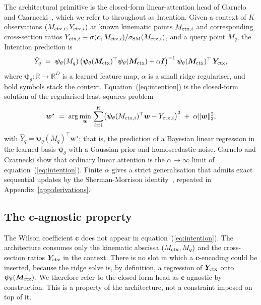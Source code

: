 \documentclass[11pt,a4paper]{article}
\newcommand{\sigsm}{\sigma_{\rm SM}}
\newcommand{\psib}{\bm{\psi}}
\begin{document}
The architectural primitive is the closed-form linear-attention head of Garnelo and Czarnecki~\cite{Garnelo:2023intention}, which we refer to throughout as Intention. Given a context of $K$ observations $(M_{{\rm ctx}, i}, Y_{{\rm ctx}, i})$ at known kinematic points $M_{{\rm ctx}, i}$ and corresponding cross-section ratios $Y_{{\rm ctx}, i} \equiv \sigma(\bm{c}, M_{{\rm ctx}, i}) / \sigsm(M_{{\rm ctx}, i})$, and a query point $M_q$, the Intention prediction is
\begin{equation}
  \hat{Y}_q \;=\; \psib_\theta(M_q)\,\bigl(\psib_\theta(\bm{M}_{\rm ctx})^\top \psib_\theta(\bm{M}_{\rm ctx}) + \alpha \bm{I}\bigr)^{-1}\,\psib_\theta(\bm{M}_{\rm ctx})^\top\,\bm{Y}_{\rm ctx},
  \label{eq:intention}
\end{equation}
where $\psib_\theta : \mathbb{R} \to \mathbb{R}^{D}$ is a learned feature map, $\alpha$ is a small ridge regulariser, and bold symbols stack the context. Equation~(\ref{eq:intention}) is the closed-form solution of the regularised least-squares problem
\begin{equation}
  \bm{w}^\star \;=\; \arg\min_{\bm{w}} \,\sum_{i=1}^K\bigl(\psib_\theta(M_{{\rm ctx}, i})^\top \bm{w} - Y_{{\rm ctx}, i}\bigr)^2 \;+\; \alpha \|\bm{w}\|_2^2,
  \label{eq:ridge}
\end{equation}
with $\hat{Y}_q = \psib_\theta(M_q)^\top \bm{w}^\star$; that is, the prediction of a Bayesian linear regression in the learned basis $\psib_\theta$ with a Gaussian prior and homoscedastic noise. Garnelo and Czarnecki show that ordinary linear attention is the $\alpha \to \infty$ limit of equation~(\ref{eq:intention}). Finite $\alpha$ gives a strict generalisation that admits exact sequential updates by the Sherman-Morrison identity~\cite{Sherman:1950}, repeated in Appendix~\ref{app:derivations}.

\subsection{The \texorpdfstring{$\bm{c}$}{c}-agnostic property}
\label{sec:c-agnostic}

The Wilson coefficient $\bm{c}$ does not appear in equation~(\ref{eq:intention}). The architecture consumes only the kinematic abscissa $(M_{\rm ctx}, M_q)$ and the cross-section ratios $\bm{Y}_{\rm ctx}$ in the context. There is no slot in which a $\bm{c}$-encoding could be inserted, because the ridge solve is, by definition, a regression of $\bm{Y}_{\rm ctx}$ onto $\psib_\theta(\bm{M}_{\rm ctx})$. We therefore refer to the closed-form head as $\bm{c}$-agnostic by construction. This is a property of the architecture, not a constraint imposed on top of it.
\end{document}
